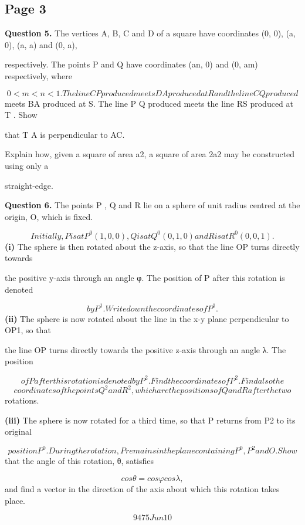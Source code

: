 \documentclass[12pt]{article}
\begin{document}
\subsection*{Page 3}
\begin{flushleft}
\bigskip\textbf{Question 5.} The vertices A, B, C and D of a square have coordinates (0, 0), (a, 0), (a, a) and (0, a),\par
respectively. The points P and Q have coordinates (an, 0) and (0, am) respectively, where\par
\[0 < m < n < 1. The line CP produced meets DA produced at R and the line CQ produced\]
meets BA produced at S. The line P Q produced meets the line RS produced at T . Show\par
that T A is perpendicular to AC.\par
Explain how, given a square of area a2, a square of area 2a2 may be constructed using only a\par
straight-edge.\par
[Note: a straight-edge is a ruler with no markings on it; no measurements (and no use of\par
compasses) are allowed in the construction.]\par
\bigskip\textbf{Question 6.} The points P , Q and R lie on a sphere of unit radius centred at the origin, O, which is fixed.\par
\[Initially, P is at P^0(1, 0, 0), Q is at Q^0(0, 1, 0) and R is at R^0(0, 0, 1).\]
\textbf{(i)} The sphere is then rotated about the z-axis, so that the line OP turns directly towards\par
the positive y-axis through an angle φ. The position of P after this rotation is denoted\par
\[by P^1. Write down the coordinates of P^1.\]
\textbf{(ii)} The sphere is now rotated about the line in the x-y plane perpendicular to OP1, so that\par
the line OP turns directly towards the positive z-axis through an angle λ. The position\par
\[of P after this rotation is denoted by P^2. Find the coordinates of P^2. Find also the\]
\[coordinates of the points Q^2 and R^2, which are the positions of Q and R after the two\]
rotations.\par
\textbf{(iii)} The sphere is now rotated for a third time, so that P returns from P2 to its original\par
\[position P^0. During the rotation, P remains in the plane containing P^0, P^2 and O. Show\]
that the angle of this rotation, θ, satisfies\par
\[cos θ = cos φ cos λ ,\]
and find a vector in the direction of the axis about which this rotation takes place.\par
\[9475 Jun10\]
\end{flushleft}
\end{document}
